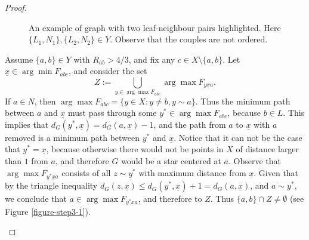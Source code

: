 \documentclass[a4paper,11pt,oneside]{amsart}
\begin{document}
\begin{proof}
\begin{figure}[!h]
\caption{An example of graph with two leaf-neighbour pairs highlighted. Here $\{L_1, N_1\}, \{L_2,N_2\} \in Y$. Observe that the couples are not ordered. }
\label{figure-leaves-neighbours}
\end{figure}

Assume $\{a,b\}\in Y$ with $R_{ab}> 4/3$, and fix any $c\in X\setminus\{a,b\}$. Let $\underline x \in \arg\min F_{abc}$, and consider the set $$Z:=\bigcup_{y\in \arg\max F_{abc}} \arg\max F_{y\underline xa}.$$
If $a\in N$, then $\arg\max F_{abc} = \{y\in X: y\neq b, y\sim a\}$. Thus the minimum path between $a$ and $\underline x$ must pass through some $y^*\in \arg\max F_{abc}$, because $b\in L$. This implies that $d_G(y^*,\underline x)= d_G(a,\underline x)-1$, and the path from $a$ to $\underline x$ with $a$ removed is a minimum path between $y^*$ and $\underline x$. Notice that it can not be the case that $y^*=\underline x$, because otherwise there would not be points in $X$ of distance larger than $1$ from $a$, and therefore $G$ would be a star centered at $a$. Observe that $\arg\max F_{y^*\underline xa}$ consists of all $z\sim y^*$ with maximum distance from $\underline x$. Given that by the triangle inequality $d_G(z,\underline x) \leq d_G(y^*,\underline x)+1 = d_G(a,\underline x)$, and $a\sim y^*$, we conclude that $a\in \arg\max F_{y^*\underline xa}$, and therefore to $Z$. Thus $\{a,b\}\cap Z \neq \emptyset$ (see Figure \ref{figure-step3-1}).

\begin{figure}[!h]
\centering
{}
\end{figure}
\end{proof}
\end{document}
